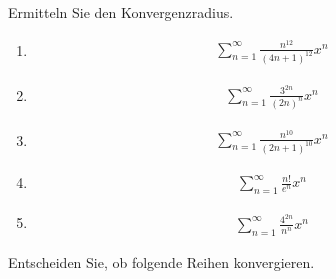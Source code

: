 \documentclass{article}
\begin{document}
Ermitteln Sie den Konvergenzradius.

\begin{multicols}{3}
\begin{enumerate}
    \item \begin{align*}
        \sum_{n = 1}^{\infty}\frac{n^{12}}{(4n + 1)^{12}}x^n
    \end{align*}

    \item \begin{align*}
        \sum_{n = 1}^{\infty}\frac{3^{2n}}{(2n)^{n}}x^n
    \end{align*}

    \item \begin{align*}
        \sum_{n = 1}^{\infty}\frac{n^{10}}{(2n + 1)^{10}}x^n
    \end{align*}

    \item \begin{align*}
        \sum_{n = 1}^{\infty}\frac{n!}{e^n}x^n
    \end{align*}

    \item \begin{align*}
        \sum_{n = 1}^{\infty}\frac{4^{2n}}{n^n}x^n
    \end{align*}
\end{enumerate}
\end{multicols}

Entscheiden Sie, ob folgende Reihen konvergieren.
\end{document}
